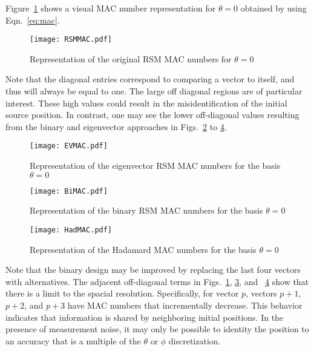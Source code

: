 \documentclass[3p,times]{elsarticle}
\begin{document}
Figure~\ref{fig:RSMMAC} shows a visual MAC number representation for $\theta=0$ obtained by using Eqn.~\ref{eq:mac}.  
\begin{figure}[ht!]
\texttt{[image: RSMMAC.pdf]}
\centering
\caption{Representation of the original RSM MAC numbers for $\theta=0$}
\label{fig:RSMMAC}
\end{figure}
Note that the diagonal entries correspond to comparing a vector to itself, and thus will always be equal to one.  
The large off diagonal regions are of particular interest.  These high values could result in the misidentification
of the initial source position.  In contrast, one may see the lower off-diagonal values resulting from the binary and eigenvector approaches in Figs.~\ref{fig:EMAC} to \ref{fig:HadMAC}.
\begin{figure}[ht!]
\texttt{[image: EVMAC.pdf]}
\centering
\caption{Representation of the eigenvector RSM MAC numbers for the basis $\theta=0$}
\label{fig:EMAC}
\end{figure}
\begin{figure}[ht!]
\texttt{[image: BiMAC.pdf]}
\centering
\caption{Representation of the binary RSM MAC numbers for the basis $\theta=0$}
\label{fig:BMAC}
\end{figure}
\begin{figure}[ht!]
\texttt{[image: HadMAC.pdf]}
\centering
\caption{Representation of the Hadamard MAC numbers for the basis $\theta=0$}
\label{fig:HadMAC}
\end{figure}
Note that the binary design may be 
improved by replacing the last four vectors with alternatives.  The adjacent off-diagonal terms in Figs.~\ref{fig:RSMMAC}, \ref{fig:BMAC}, and ~\ref{fig:HadMAC} show that there is a limit to the
spacial resolution.  Specifically, for vector $p$, vectors $p+1$, $p+2$, and $p+3$ have MAC numbers that incrementally decrease.  This behavior indicates that information is shared by neighboring initial
positions.  In the presence of measurement noise, it may only be possible to identity the position to an accuracy that is a multiple of the $\theta$ or $\phi$ discretization.
\end{document}
